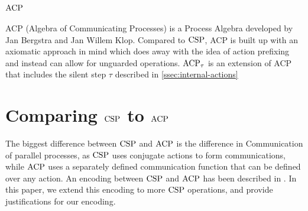 \documentclass[../hons_project.tex]{subfiles}
\begin{document}
\section{\texorpdfstring{$\mathrm{ACP}$}{acp}}
ACP (Algebra of Communicating Processes) \citep{bergstraProcessAlgebraSynchronous1984} is a Process Algebra developed by Jan Bergstra and Jan Willem Klop. Compared to $\mathrm{CSP}$, ACP is built up with an axiomatic approach in mind which does away with the idea of action prefixing and instead can allow for unguarded operations. $\mathrm{ACP}_{\tau}$ \citep{bergstraACPtUniversalAxiom1989} is an extension of ACP that includes the silent step $\tau$ described in \cref{ssec:internal-actions}

\section{Comparing \texorpdfstring{$\mathrm{CSP}$}{CSP} to \texorpdfstring{$\mathrm{ACP}$}{ACP}}
The biggest difference between $\mathrm{CSP}$ and $\mathrm{ACP}$ is the difference in Communication of parallel processes, as $\mathrm{CSP}$ uses conjugate actions to form communications, while $\mathrm{ACP}$ uses a separately defined communication function that can be defined over any action. An encoding between $\mathrm{CSP}$ and $\mathrm{ACP}$ has been described in \cite{vanglabbeekTheoryEncodingsExpressiveness2024}. In this paper, we extend this encoding to more $\mathrm{CSP}$ operations, and provide justifications for our encoding.


\end{document}

